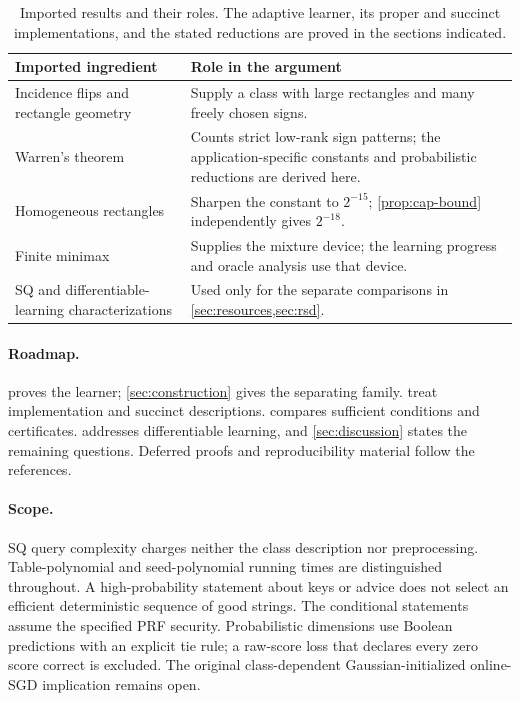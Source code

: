 \begin{table}[t]
\centering\small
\begin{tabularx}{\linewidth}{@{}p{.30\linewidth}X@{}}
\toprule
Imported ingredient & Role in the argument\\\midrule
Incidence flips and rectangle geometry \citep{HHPTZ22} & Supply a class with large rectangles and many freely chosen signs.\\
Warren's theorem \citep{Warren68,AMY16} & Counts strict low-rank sign patterns; the application-specific constants and probabilistic reductions are derived here.\\
Homogeneous rectangles \citep{APP05,HHPTZ22} & Sharpen the constant to $2^{-15}$; \cref{prop:cap-bound} independently gives $2^{-18}$.\\
Finite minimax \citep{HHPTZ22} & Supplies the mixture device; the learning progress and oracle analysis use that device.\\
SQ and differentiable-learning characterizations \citep{Feldman17,AKMSS21} & Used only for the separate comparisons in \cref{sec:resources,sec:rsd}.\\
\bottomrule
\end{tabularx}
\caption{Imported results and their roles. The adaptive learner, its proper and succinct implementations, and the stated reductions are proved in the sections indicated.}\label{tab:imports}
\end{table}

\paragraph{Roadmap.}
 proves the learner; \cref{sec:construction} gives the separating family.  treat implementation and succinct descriptions.  compares sufficient conditions and certificates.  addresses differentiable learning, and \cref{sec:discussion} states the remaining questions. Deferred proofs and reproducibility material follow the references.

\paragraph{Scope.}
SQ query complexity charges neither the class description nor preprocessing. Table-polynomial and seed-polynomial running times are distinguished throughout. A high-probability statement about keys or advice does not select an efficient deterministic sequence of good strings. The conditional statements assume the specified PRF security. Probabilistic dimensions use Boolean predictions with an explicit tie rule; a raw-score loss that declares every zero score correct is excluded. The original class-dependent Gaussian-initialized online-SGD implication remains open.
